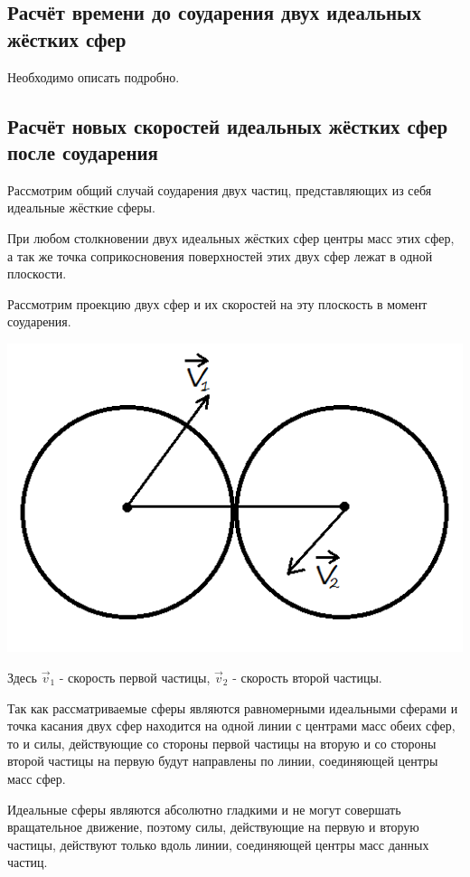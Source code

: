 \documentclass[a4paper]{article}
\begin{document}
\subsection{Расчёт времени до соударения двух идеальных жёстких сфер}
Необходимо описать подробно.

\subsection{Расчёт новых скоростей идеальных жёстких сфер после соударения}
Рассмотрим общий случай соударения двух частиц, представляющих из себя идеальные жёсткие сферы.

При любом столкновении двух идеальных жёстких сфер центры масс этих сфер, а так же точка соприкосновения поверхностей этих двух сфер лежат в одной плоскости.

Рассмотрим проекцию двух сфер и их скоростей на эту плоскость в момент соударения. 

\begin{center}
\includegraphics[scale=0.3]{collission_of_two_particles.png}
\end{center}

Здесь $ \vec{v}_1 $ - скорость первой частицы, $ \vec{v}_2 $ - скорость второй частицы.

Так как рассматриваемые сферы являются равномерными идеальными сферами и точка касания двух сфер находится на одной линии с центрами масс обеих сфер, то и силы, действующие со стороны первой частицы на вторую и со стороны второй частицы на первую будут направлены по линии, соединяющей центры масс сфер.

Идеальные сферы являются абсолютно гладкими и не могут совершать вращательное движение, поэтому силы, действующие на первую и вторую частицы, действуют только вдоль линии, соединяющей центры масс данных частиц.
\end{document}
